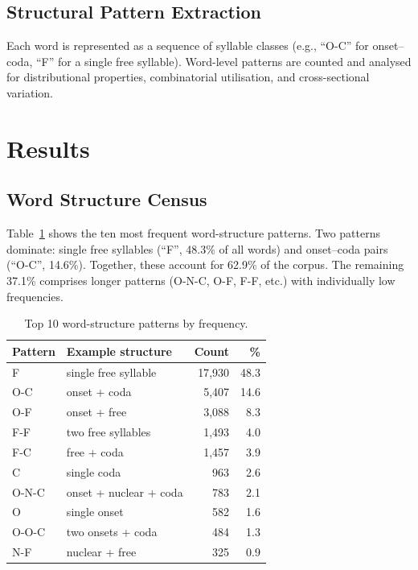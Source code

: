 \subsection{Structural Pattern Extraction}

Each word is represented as a sequence of syllable classes (e.g., ``O-C'' for onset--coda, ``F'' for a single free syllable).  Word-level patterns are counted and analysed for distributional properties, combinatorial utilisation, and cross-sectional variation.


\section{Results}
\label{sec:results}

\subsection{Word Structure Census}

Table~\ref{tab:patterns} shows the ten most frequent word-structure patterns.  Two patterns dominate: single free syllables (``F'', 48.3\% of all words) and onset--coda pairs (``O-C'', 14.6\%).  Together, these account for 62.9\% of the corpus.  The remaining 37.1\% comprises longer patterns (O-N-C, O-F, F-F, etc.) with individually low frequencies.

\begin{table}[htbp]
\caption{Top 10 word-structure patterns by frequency.}
\label{tab:patterns}
\centering
\begin{tabular}{llrr}
\toprule
Pattern & Example structure & Count & \% \\
\midrule
F          & single free syllable & 17{,}930 & 48.3 \\
O-C        & onset + coda         &  5{,}407 & 14.6 \\
O-F        & onset + free         &  3{,}088 &  8.3 \\
F-F        & two free syllables   &  1{,}493 &  4.0 \\
F-C        & free + coda          &  1{,}457 &  3.9 \\
C          & single coda          &    963 &  2.6 \\
O-N-C      & onset + nuclear + coda & 783 &  2.1 \\
O          & single onset         &    582 &  1.6 \\
O-O-C      & two onsets + coda    &    484 &  1.3 \\
N-F        & nuclear + free       &    325 &  0.9 \\
\bottomrule
\end{tabular}
\end{table}

